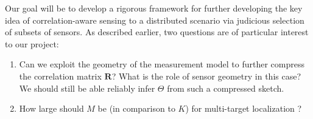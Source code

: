 Our goal will be to develop a rigorous framework for further developing the key idea of correlation-aware sensing to a distributed scenario via judicious selection of subsets of sensors. As described earlier, two questions are of particular interest to our project:
\begin{enumerate}
\item Can we exploit the geometry of the measurement model to further compress the  correlation matrix $\mathbf{R}$? What is the role of sensor geometry in this case? We should still be able reliably infer $\Theta$ from such a compressed sketch.
\item How large should $M$ be (in comparison to $K$) for multi-target localization ?
\end{enumerate}
